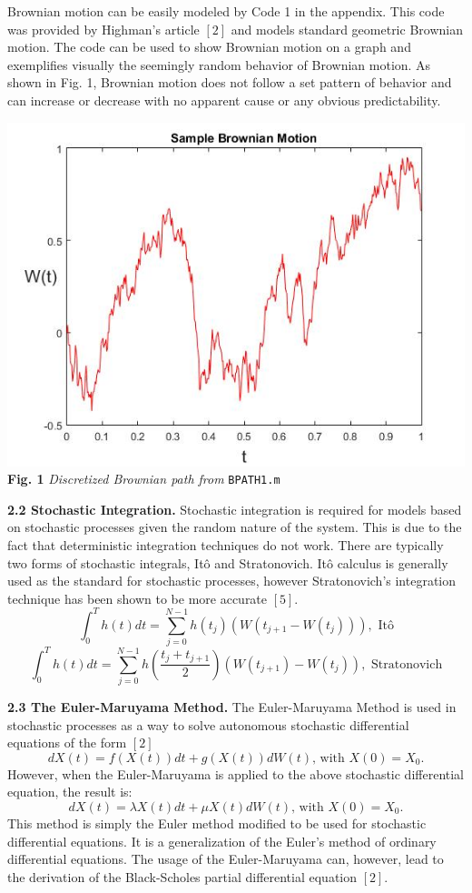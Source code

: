 \documentclass{report}
\begin{document}
	Brownian motion can be easily modeled by Code 1 in the appendix. This code was provided by Highman's article $[2]$ and models standard geometric Brownian motion. The code can be used to show Brownian motion on a graph and exemplifies visually the seemingly random behavior of Brownian motion. As shown in Fig. 1, Brownian motion does not follow a set pattern of behavior and can increase or decrease with no apparent cause or any obvious predictability.  
	\begin{center}
		\includegraphics[scale=0.4]{example1}
		\\ \small\textbf{Fig. 1}  \textit{Discretized Brownian path from} \texttt{BPATH1.m}
	\end{center} \normalsize

	\textbf{2.2 Stochastic Integration.} Stochastic integration is required for models based on stochastic processes given the random nature of the system. This is due to the fact that deterministic integration techniques do not work. There are typically two forms of stochastic integrals, It\^{o} and Stratonovich. It\^{o} calculus is generally used as the standard for stochastic processes, however Stratonovich's integration technique has been shown to be more accurate $[5]$.\\
	\[
	\int_{0}^{T} h(t)dt = \sum_{j=0}^{N-1}h(t_j)(W(t_{j+1} - W(t_j))), \text{ It\^{o}}\]
	\[ \int_{0}^{T} h(t)dt = \sum_{j=0}^{N-1}h(\frac{t_j+t_{j+1}}{2})(W(t_{j+1}) - W(t_j)), \text{ Stratonovich}
	\]
	
	\textbf{2.3 The Euler-Maruyama Method.} The Euler-Maruyama Method is used in stochastic processes as a way to solve autonomous stochastic differential equations of the form $[2]$
	\[dX(t) = f(X(t))dt + g(X(t))dW(t) \text{, with } X(0)=X_0. \]
	However, when the Euler-Maruyama is applied to the above stochastic differential equation, the result is:
	\[dX(t) = \lambda X(t)dt + \mu X(t)dW(t) \text{, with } X(0)=X_0. \]
	This method is simply the Euler method modified to be used for stochastic differential equations. It is a generalization of the Euler's method of ordinary differential equations. The usage of the Euler-Maruyama can, however, lead to the derivation of the Black-Scholes partial differential equation $[2]$.\\
	
\end{document}
